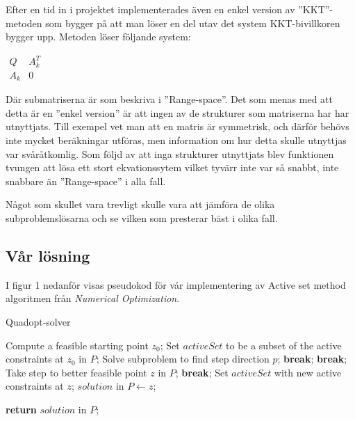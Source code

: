 Efter en tid in i projektet implementerades även en enkel version av ''KKT''-metoden som bygger på att man löser en del utav det system KKT-bivillkoren bygger upp. Metoden löser följande system:

$\begin{matrix}
Q & A_k^T \\
A_k & 0
\end{matrix}$


Där submatriserna är som beskriva i ''Range-space''. Det som menas med att detta är en ''enkel version'' är att ingen av de strukturer som matriserna har har utnyttjats. Till exempel vet man att en matris är symmetrisk, och därför behövs inte mycket beräkningar utföras, men information om hur detta skulle utnyttjas var svåråtkomlig. Som följd av att inga strukturer utnyttjats blev funktionen tvungen att lösa ett stort ekvationssytem vilket tyvärr inte var så snabbt, inte snabbare än ''Range-space'' i alla fall.


Något som skullet vara trevligt skulle vara att jämföra de olika subproblemslösarna och se vilken som presterar bäst i olika fall.

\subsection{Vår lösning}
I figur 1 nedanför visas pseudokod för vår implementering av Active set method algoritmen från \emph{Numerical Optimization}.

\begin{algorithm}[H]
\caption{Quadopt-solver}
\begin{algorithmic}
	\State Compute a feasible starting point $z_0$;
\EndIf	
\State Set $activeSet$ to be a subset of the active constraints at $z_0$ in $P$;
	\State Solve subproblem to find step direction $p$;
			\State \textbf{break};
		\EndIf		
			\State \textbf{break};
		\EndIf
	\Else
		\State Take step to better feasible point $z$ in $P$;
			\State \textbf{break};
		\EndIf
		\State Set $activeSet$ with new active constraints at $z$;	
	\EndIf
\EndWhile
\State  $solution$ in $P\gets z$;

\State \textbf{return} $solution$ in $P$;
	
\EndProcedure
\end{algorithmic}
\end{algorithm}



